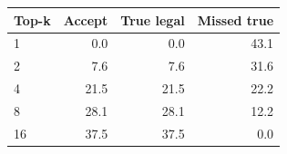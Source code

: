 \begin{tabular}{lrrr}
\toprule
Top-k & Accept & True legal & Missed true \\
\midrule
1 & 0.0 & 0.0 & 43.1 \\
2 & 7.6 & 7.6 & 31.6 \\
4 & 21.5 & 21.5 & 22.2 \\
8 & 28.1 & 28.1 & 12.2 \\
16 & 37.5 & 37.5 & 0.0 \\
\bottomrule
\end{tabular}
